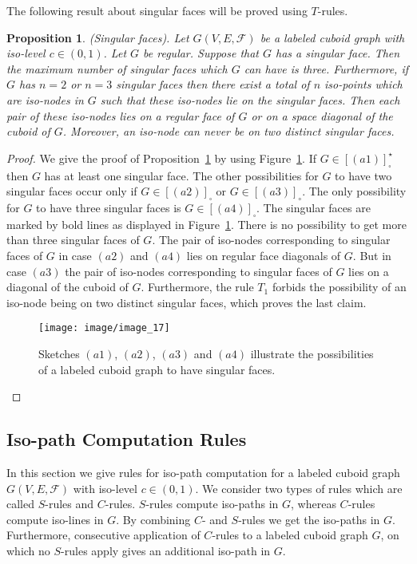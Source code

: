 \documentclass[a4paper,11pt]{article}
\newtheorem{proposition}[theorem]{Proposition}
\begin{document}
The following result about singular faces will be proved using $T$-rules.
\begin{proposition}(Singular faces). Let $G(V,E,\mathcal{F})$ be a labeled cuboid graph with iso-level
$c\in (0,1)$. Let $G$ be regular. Suppose that $G$ has a singular face. Then the maximum number of
singular faces which $G$ can have is three. Furthermore, if $G$ has $n=2$ or $n=3$ singular faces then
there exist a total of $n$ iso-points which are iso-nodes in $G$ such that these iso-nodes lie on the
singular faces. Then each pair of these iso-nodes lies on a regular face of $G$ or on a space diagonal
of the cuboid of $G$. Moreover, an iso-node can never be on two distinct singular faces.
\label{prop:iso-path-1}
\end{proposition}
\begin{proof}
We give the proof of Proposition~\ref{prop:iso-path-1} by using Figure~\ref{image_17}.
If $G\in [(a1)]_{\square}^{\star}$ then $G$ has at least one singular face. The other possibilities
for $G$ to have two singular faces occur only if $G\in [(a2)]_{\square}$ or $G\in [(a3)]_{\circ}$.
The only possibility for $G$ to have three singular faces is $G\in [(a4)]_{\square}$.
The singular faces are marked by bold lines as displayed in Figure~\ref{image_17}. There is no possibility
to get more than three singular faces of $G$. The pair of iso-nodes corresponding to singular faces
of $G$ in case $(a2)$ and $(a4)$ lies on regular face diagonals of $G$. But in case $(a3)$ the pair of
iso-nodes corresponding to singular faces of $G$ lies on a diagonal of the cuboid of $G$. Furthermore,
the rule $T_1$ forbids the possibility of an iso-node being on two distinct singular faces, which
proves the last claim.
\begin{figure}[!ht]
\texttt{[image: image/image\_17]}
\caption{Sketches $(a1)$, $(a2)$, $(a3)$ and $(a4)$ illustrate the possibilities of a labeled
cuboid graph to have singular faces.}
\label{image_17}
\end{figure}
\end{proof}
\FloatBarrier

\subsection{Iso-path Computation Rules}
In this section we give rules for iso-path computation for a labeled cuboid graph $G(V,E,\mathcal{F})$ with
iso-level $c\in (0,1)$. We consider two types of rules which are called $S$-rules and $C$-rules.
$S$-rules compute iso-paths in $G$, whereas $C$-rules compute iso-lines in $G$. By combining $C$- and
$S$-rules we get the iso-paths in $G$. Furthermore, consecutive application of $C$-rules to a labeled
cuboid graph $G$, on which no $S$-rules apply gives an additional iso-path in $G$.
\end{document}
